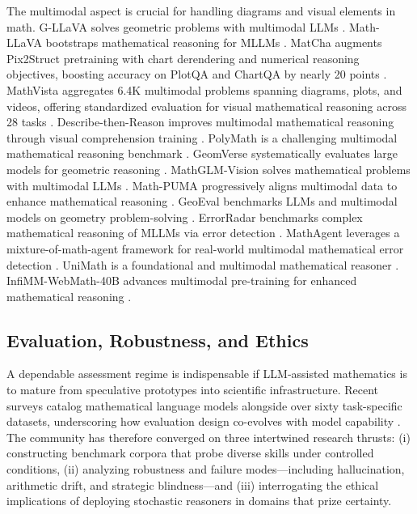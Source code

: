 \documentclass[acmsmall,anonymous]{acmart}
\begin{document}
The multimodal aspect is crucial for handling diagrams and visual elements in math. G-LLaVA solves geometric problems with multimodal LLMs \cite{gao2023}. Math-LLaVA bootstraps mathematical reasoning for MLLMs \cite{shi2024}. MatCha augments Pix2Struct pretraining with chart derendering and numerical reasoning objectives, boosting accuracy on PlotQA and ChartQA by nearly 20 points \cite{liu-2023-matcha}. MathVista aggregates 6.4K multimodal problems spanning diagrams, plots, and videos, offering standardized evaluation for visual mathematical reasoning across 28 tasks \cite{lu-2024-mathvista}. Describe-then-Reason improves multimodal mathematical reasoning through visual comprehension training \cite{jia2024}. PolyMath is a challenging multimodal mathematical reasoning benchmark \cite{gupta2024}. GeomVerse systematically evaluates large models for geometric reasoning \cite{kazemi2023}. MathGLM-Vision solves mathematical problems with multimodal LLMs \cite{yang2024b}. Math-PUMA progressively aligns multimodal data to enhance mathematical reasoning \cite{zhuang2024}. GeoEval benchmarks LLMs and multimodal models on geometry problem-solving \cite{zhang2024d}. ErrorRadar benchmarks complex mathematical reasoning of MLLMs via error detection \cite{yan2024a}. MathAgent leverages a mixture-of-math-agent framework for real-world multimodal mathematical error detection \cite{yan2025b}. UniMath is a foundational and multimodal mathematical reasoner \cite{liang2023a}. InfiMM-WebMath-40B advances multimodal pre-training for enhanced mathematical reasoning \cite{han2024}.

\subsection{Evaluation, Robustness, and Ethics}\label{sec:evaluation}
A dependable assessment regime is indispensable if LLM‐assisted mathematics is to mature from speculative prototypes into scientific infrastructure.  Recent surveys catalog mathematical language models alongside over sixty task-specific datasets, underscoring how evaluation design co-evolves with model capability \cite{liu-2025-math-lm-survey}.  The community has therefore converged on three intertwined research thrusts: (i) constructing benchmark corpora that probe diverse skills under controlled conditions, (ii) analyzing robustness and failure modes—including hallucination, arithmetic drift, and strategic blindness—and (iii) interrogating the ethical implications of deploying stochastic reasoners in domains that prize certainty.
\end{document}
